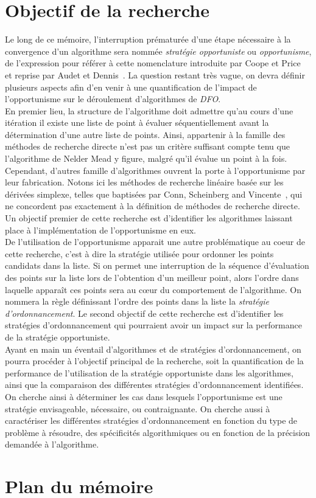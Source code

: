 \section{Objectif de la recherche} \label{sec:obj}
Le long de ce mémoire, l'interruption prématurée d'une étape nécessaire à la convergence d'un algorithme sera nommée \textit{stratégie opportuniste} ou \textit{opportunisme}, de l'expression pour référer à cette nomenclature introduite par Coope et Price~\cite{CoPr01a} et reprise par Audet et Dennis~\cite{AuDe04a}. La question restant très vague, on devra définir plusieurs aspects afin d'en venir à une quantification de l'impact de l'opportunisme sur le déroulement d'algorithmes de \textit{DFO}.\\
En premier lieu, la structure de l'algorithme doit admettre qu'au cours d'une itération il existe une liste de point à évaluer séquentiellement avant la détermination d'une autre liste de points. Ainsi, appartenir à la famille des méthodes de recherche directe n'est pas un critère suffisant compte tenu que l'algorithme de Nelder Mead y figure, malgré qu'il évalue un point à la fois. Cependant, d'autres famille d'algorithmes ouvrent la porte à l'opportunisme par leur fabrication. Notons ici les méthodes de recherche linéaire basée sur les dérivées simplexe, telles que baptisées par Conn, Scheinberg and Vincente~\cite{CoScVibook}, qui ne concordent pas exactement à la définition de méthodes de recherche directe. Un objectif premier de cette recherche est d'identifier les algorithmes laissant place à l'implémentation de l'opportunisme en eux.\\
De l'utilisation de l'opportunisme apparait une autre problématique au coeur de cette recherche, c'est à dire la stratégie utilisée pour ordonner les points candidats dans la liste. Si on permet une interruption de la séquence d'évaluation des points sur la liste lors de l'obtention d'un meilleur point, alors l'ordre dans laquelle apparaît ces points sera au cœur du comportement de l'algorithme. On nommera la règle définissant l'ordre des points dans la liste la \textit{stratégie d'ordonnancement}. Le second objectif de cette recherche est d'identifier les stratégies d'ordonnancement qui pourraient avoir un impact sur la performance de la stratégie opportuniste.\\
Ayant en main un éventail d'algorithmes et de stratégies d'ordonnancement, on pourra procéder à l'objectif principal de la recherche, soit la quantification de la performance de l'utilisation de la stratégie opportuniste dans les algorithmes, ainsi que la comparaison des différentes stratégies d'ordonnancement identifiées. On cherche ainsi à déterminer les cas dans lesquels l'opportunisme est une stratégie envisageable, nécessaire, ou contraignante. On cherche aussi à caractériser les différentes stratégies d'ordonnancement en fonction du type de problème à résoudre, des spécificités algorithmiques ou en fonction de la précision demandée à l'algorithme. 
\section{Plan du mémoire}\label{sec:pla}

